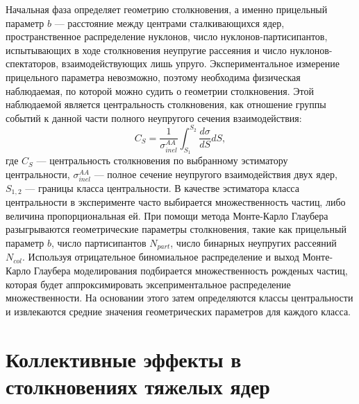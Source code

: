 Начальная фаза определяет геометрию столкновения, а именно прицельный параметр $b$ --- расстояние между центрами сталкивающихся ядер, пространственное распределение нуклонов, число нуклонов-партисипантов, испытывающих в ходе столкновения неупругие рассеяния и число нуклонов-спектаторов, взаимодействующих лишь упруго.  
Экспериментальное измерение прицельного параметра невозможно, поэтому необходима физическая наблюдаемая, по которой можно судить о геометрии столкновения.
Этой наблюдаемой является центральность столкновения, как отношение группы событий к данной части полного неупругого сечения взаимодействия:
%
\begin{equation}
    C_S = \frac{1}{ \sigma_{inel}^{AA} } \int_{S_1}^{S_2} \frac{d\sigma}{dS}dS,
\end{equation}
где $C_S$ --- центральность столкновения по выбранному эстиматору центральности, $\sigma_{inel}^{AA}$ --- полное сечение неупругого взаимодействия двух ядер, $S_{1,2}$ --- границы класса центральности.
В качестве эстиматора класса центральности в эксперименте часто выбирается множественность частиц, либо величина пропорциональная ей.
При помощи метода Монте-Карло Глаубера разыгрываются геометрические параметры столкновения, такие как прицельный параметр $b$, число партисипантов $N_{part}$, число бинарных неупругих рассеяний $N_{col}$.
Используя отрицательное биномиальное распределение и выход Монте-Карло Глаубера моделирования подбирается множественность рожденых частиц, которая будет аппроксимировать эксеприментальное распределение множественности.
На основании этого затем определяются классы центральности и извлекаются средние значения геометрических параметров для каждого класса.

\section{Коллективные эффекты в столкновениях тяжелых ядер}

